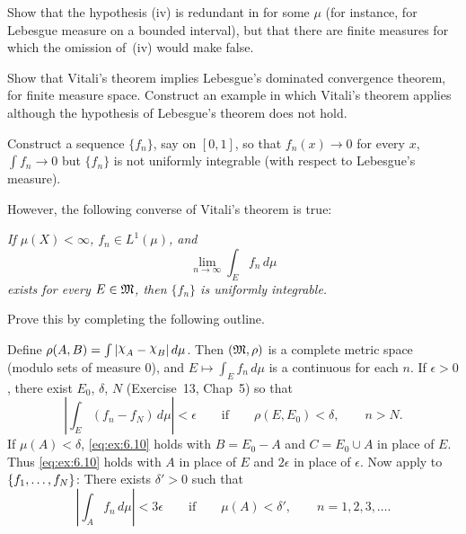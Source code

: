 \begin{enumerate}
\begin{excopy}
\begin{itemize}
Show that the hypothesis (iv)  is redundant in  for some \(\mu\)
(for instance, for Lebesgue measure on a bounded interval), but that there are
finite measures for which the omission of~(iv)
would make  false.

Show that Vitali's theorem implies Lebesgue's dominated convergence theorem,
for finite measure space. Construct an example in which Vitali's theorem
applies although the hypothesis of
Lebesgue's theorem does not hold.

Construct a sequence \(\{f_n\}\), say on \([0,1]\), so that
\(f_n(x)\to 0\) for every $x$,
\(\int f_n\to 0\) but \(\{f_n\}\) 
is not uniformly integrable (with respect to Lebesgue's measure).

However, the following converse of Vitali's theorem is true:

\textsl{
If \(\mu(X)<\infty\), \(f_n\in L^1(\mu)\), and
\begin{equation*}
\lim_{n\to\infty} \int_E f_n\,d\mu
\end{equation*}
exists for every \(E\in \mathfrak{M}\), then \(\{f_n\}\) is uniformly integrable.
}

Prove this by completing the following outline.

Define \(\rho(A,B) = \int |\chhi_A - \chhi_B|\,d\mu\).
Then \((\mathfrak{M},\rho)\) is a complete metric space
(modulo sets of measure $0$), and \(E\mapsto \int_E f_n\,d\mu\) is
a continuous for each $n$.
If \(\epsilon > 0\), there exist \(E_0\), \(\delta\), $N$
(Exercise~13, Chap~5) so that
\begin{equation} \label{eq:ex:6.10}
\left| \int_E (f_n - f_N)\,d\mu\right| < \epsilon
\qquad \textrm{if}\qquad
\rho(E, E_0) < \delta, \qquad n > N.
\end{equation}
If \(\mu(A)<\delta\), \eqref{eq:ex:6.10} holds with \(B = E_0 - A\)
and \(C = E_0 \cup A\)
in place of $E$.
Thus \eqref{eq:ex:6.10} holds with $A$ in place of $E$ and \(2\epsilon\)
in place of \(\epsilon\).
Now apply  to \(\{f_1,\ldots,f_{N}\}\): There exists \(\delta'>0\)
such that
\begin{equation*}
\left| \int_A f_n\,d\mu \right| < 3\epsilon
\qquad \textrm{if}\qquad
\mu(A) < \delta', \qquad n=1,2,3,\ldots.
\end{equation*}
\end{itemize}
\end{excopy}


\end{enumerate}
